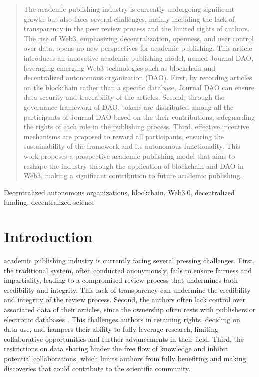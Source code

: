 \documentclass[lettersize,journal]{IEEEtran}
\begin{document}
\begin{abstract}

The academic publishing industry is currently undergoing significant growth but also faces several challenges, mainly including the lack of transparency in the peer review process and the limited rights of authors. The rise of Web3, emphasizing decentralization, openness, and user control over data, opens up new perspectives for academic publishing. This article introduces an innovative academic publishing model, named Journal DAO, leveraging emerging Web3 technologies such as blockchain and decentralized autonomous organization (DAO). First, by recording articles on the blockchain rather than a specific database, Journal DAO can ensure data security and traceability of the articles. Second, through the governance framework of DAO, tokens are distributed among all the participants of Journal DAO based on the their contributions, safeguarding the rights of each role in the publishing process. Third, effective incentive mechanisms are proposed to reward all participants, ensuring the sustainability of the framework and its autonomous functionality. This work proposes a prospective academic publishing model that aims to reshape the industry through the application of blockchain and DAO in Web3, making a significant contribution to future academic publishing.


\end{abstract}


\begin{IEEEkeywords}
Decentralized autonomous organizations, blockchain, Web3.0, decentralized funding, decentralized science
\end{IEEEkeywords}

\section{Introduction \label{sec:introduction}}


 academic publishing industry is currently facing several pressing challenges. First, the traditional system, often conducted anonymously, fails to ensure fairness and impartiality, leading to a compromised review process that undermines both credibility and integrity. This lack of transparency can undermine the credibility and integrity of the review process. Second,
the authors often lack control over associated data of their articles, since the ownership often rests with publishers or electronic databases \cite{lancaster1995evolution}. This challenges authors in retaining rights, deciding on data use, and hampers their ability to fully leverage research, limiting collaborative opportunities and further advancements in their field. Third, the restrictions on data sharing hinder the free flow of knowledge and inhibit potential collaborations, which limits authors from fully benefiting and making discoveries that could contribute to the scientific community.
\end{document}
